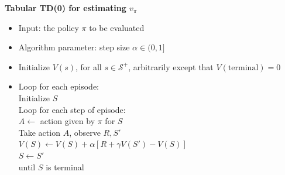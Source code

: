 \textbf{Tabular TD(0) for estimating $v_\pi$}
\begin{itemize}[leftmargin=*]
	\item[] Input: the policy $\pi$ to be evaluated
	\item[] Algorithm parameter: step size $\alpha \in (0, 1]$
	\item[] Initialize $V(s)$, for all $s \in \mathcal{S}^+$, arbitrarily except that $V(\text{terminal}) = 0$

	\item[] Loop for each episode:\\
	      Initialize $S$\\
	      Loop for each step of episode:\\
	      \hspace*{1em} $A \leftarrow$ action given by $\pi$ for $S$\\
	      \hspace*{1em} Take action $A$, observe $R, S'$\\
	      \hspace*{1em} $V(S) \leftarrow V(S) + \alpha [R + \gamma V(S') - V(S)]$\\
	      \hspace*{1em} $S \leftarrow S'$\\
	      until $S$ is terminal
\end{itemize}

